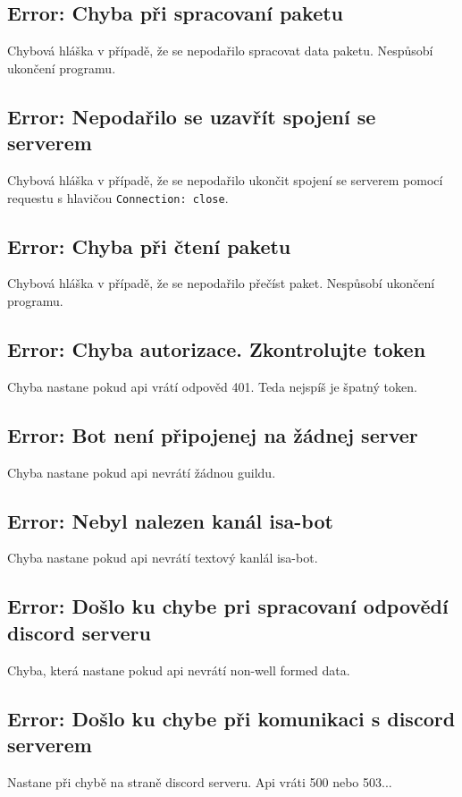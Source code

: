 \documentclass[a4paper,11pt]{article}
\begin{document}
\subsection{Error: Chyba při spracovaní paketu}
Chybová hláška v případě, že se nepodařilo spracovat data paketu. Nespůsobí ukončení programu.

\subsection{Error: Nepodařilo se uzavřít spojení se serverem}
Chybová hláška v případě, že se nepodařilo ukončit spojení se serverem pomocí requestu s hlavičou \texttt{Connection: close}.

\subsection{Error: Chyba při čtení paketu}
Chybová hláška v případě, že se nepodařilo přečíst paket. Nespůsobí ukončení programu.

\subsection{Error: Chyba autorizace. Zkontrolujte token}
Chyba nastane pokud api vrátí odpověd 401. Teda nejspíš je špatný token.

\subsection{Error: Bot není připojenej na žádnej server}
Chyba nastane pokud api nevrátí žádnou guildu.

\subsection{Error: Nebyl nalezen kanál isa-bot}
Chyba nastane pokud api nevrátí textový kanlál isa-bot.

\subsection{Error: Došlo ku chybe pri spracovaní odpovědí discord serveru}
Chyba, která nastane pokud api nevrátí non-well formed data.

\subsection{Error: Došlo ku chybe při komunikaci s discord serverem}
Nastane při chybě na straně discord serveru. Api vráti 500 nebo 503...
\end{document}
